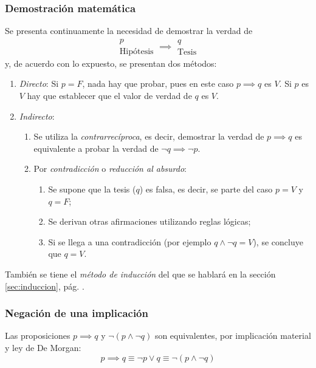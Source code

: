 \subsubsection{Demostración matemática}

Se presenta continuamente la necesidad de demostrar la verdad de
\[ \begin{array}{c}
	p\\
	\mbox{Hipótesis}
\end{array} \implies \begin{array}{c}
q\\
\mbox{Tesis}
\end{array} \]
y, de acuerdo con lo expuesto, se presentan dos métodos:

\begin{enumerate}[label=\roman*)]
	\item \textit{Directo}: Si $p = F$, nada hay que probar, pues en este caso $p \implies q$ es $V$. Si $p$ es $V$ hay que establecer que el valor de verdad de $q$ es $V$.
	\item \textit{Indirecto}:
	\begin{enumerate}[label=\alph*)]
		\item Se utiliza la \textit{contrarrecíproca}, es decir, demostrar la verdad de $p \implies q$ es equivalente a probar la verdad de $\neg q \implies \neg p$.
		\item Por \textit{contradicción} o \textit{reducción al absurdo}:
		\begin{enumerate}
			\item Se supone que la tesis ($q$) es falsa, es decir, se parte del caso $p = V$ y $q = F$;
			\item Se derivan otras afirmaciones utilizando reglas lógicas;
			\item Si se llega a una contradicción (por ejemplo $q \land \neg q = V$), se concluye que $q = V$.
		\end{enumerate}
	\end{enumerate}
\end{enumerate}

\begin{lgnote}
También se tiene el \textit{método de inducción} del que se hablará en la sección \ref{sec:induccion}, pág. \pageref{sec:induccion}.
\end{lgnote}

\subsubsection{Negación de una implicación}
Las proposiciones $p \implies q$ y $\neg (p \land \neg q)$ son equivalentes, por implicación material y ley de De Morgan:
\[ p \implies q \equiv \neg p \lor q \equiv \neg \left( p \land \neg q \right) \]

